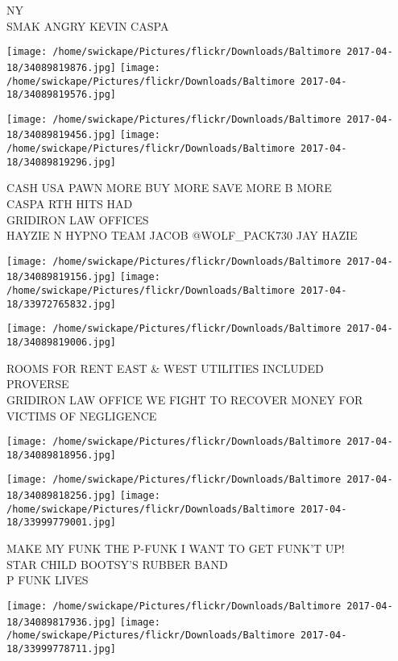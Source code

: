 \documentclass[10pt,letterpaper]{article}
\begin{document}
NY\\
SMAK ANGRY KEVIN CASPA\\
\pagebreak

\texttt{[image: /home/swickape/Pictures/flickr/Downloads/Baltimore 2017-04-18/34089819876.jpg]}
\texttt{[image: /home/swickape/Pictures/flickr/Downloads/Baltimore 2017-04-18/34089819576.jpg]}

\texttt{[image: /home/swickape/Pictures/flickr/Downloads/Baltimore 2017-04-18/34089819456.jpg]}
\texttt{[image: /home/swickape/Pictures/flickr/Downloads/Baltimore 2017-04-18/34089819296.jpg]}

CASH USA PAWN MORE BUY MORE SAVE MORE B MORE\\
CASPA RTH HITS HAD\\
GRIDIRON LAW OFFICES\\
HAYZIE N HYPNO TEAM JACOB @WOLF\_PACK730 JAY HAZIE\\
\pagebreak

\texttt{[image: /home/swickape/Pictures/flickr/Downloads/Baltimore 2017-04-18/34089819156.jpg]}
\texttt{[image: /home/swickape/Pictures/flickr/Downloads/Baltimore 2017-04-18/33972765832.jpg]}

\texttt{[image: /home/swickape/Pictures/flickr/Downloads/Baltimore 2017-04-18/34089819006.jpg]}

ROOMS FOR RENT EAST \& WEST UTILITIES INCLUDED\\
PROVERSE\\
GRIDIRON LAW OFFICE WE FIGHT TO RECOVER MONEY FOR VICTIMS OF NEGLIGENCE\\
\pagebreak

\texttt{[image: /home/swickape/Pictures/flickr/Downloads/Baltimore 2017-04-18/34089818956.jpg]}

\vspace{0.25in}
\texttt{[image: /home/swickape/Pictures/flickr/Downloads/Baltimore 2017-04-18/34089818256.jpg]}
\texttt{[image: /home/swickape/Pictures/flickr/Downloads/Baltimore 2017-04-18/33999779001.jpg]}

MAKE MY FUNK THE P{-}FUNK I WANT TO GET FUNK'T UP!\\
STAR CHILD BOOTSY'S RUBBER BAND\\
P FUNK LIVES\\
\pagebreak

\texttt{[image: /home/swickape/Pictures/flickr/Downloads/Baltimore 2017-04-18/34089817936.jpg]}
\texttt{[image: /home/swickape/Pictures/flickr/Downloads/Baltimore 2017-04-18/33999778711.jpg]}
\end{document}
